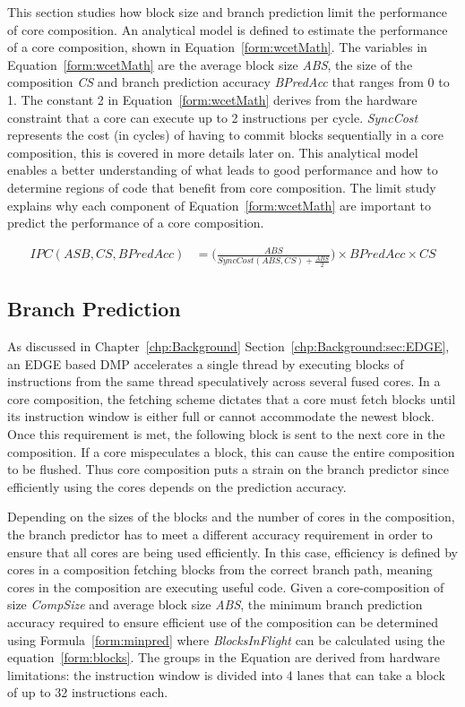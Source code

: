 This section studies how block size and branch prediction limit the performance of core composition.
An analytical model is defined to estimate the performance of a core composition, shown in Equation~\ref{form:wcetMath}.
The variables in Equation~\ref{form:wcetMath} are the average block size \textit{ABS},  the size of the composition \textit{CS} and branch prediction accuracy \textit{BPredAcc} that ranges from 0 to 1.
The constant 2 in Equation~\ref{form:wcetMath} derives from the hardware constraint that a core can execute up to 2 instructions per cycle.
\textit{SyncCost} represents the cost (in cycles) of having to commit blocks sequentially in a core composition, this is covered in more details later on.
This analytical model enables a better understanding of what leads to good performance and how to determine regions of code that benefit from core composition.
The limit study explains why each component of Equation~\ref{form:wcetMath} are important to predict the performance of a core composition.

\begin{align}\label{form:wcetMath}
IPC(ASB,CS,BPredAcc) &= \bigg(\frac{ABS}{SyncCost(ABS,CS) + {\frac{ABS}{2}}}\bigg) \times BPredAcc \times CS
\end{align}


\subsection{Branch Prediction}

As discussed in Chapter~\ref{chp:Background} Section~\ref{chp:Background:sec:EDGE}, an EDGE based DMP accelerates a single thread by executing blocks of instructions from the same thread speculatively across several fused cores. 
In a core composition, the fetching scheme dictates that a core must fetch blocks until its instruction window is either full or cannot accommodate the newest block.
Once this requirement is met, the following block is sent to the next core in the composition.
If a core mispeculates a block, this can cause the entire composition to be flushed.
Thus core composition puts a strain on the branch predictor since efficiently using the cores depends on the prediction accuracy.

Depending on the sizes of the blocks and the number of cores in the composition, the branch predictor has to meet a different accuracy requirement in order to ensure that all cores are being used efficiently.
In this case, efficiency is defined by cores in a composition fetching blocks from the correct branch path, meaning cores in the composition are executing useful code.
Given a core-composition of size \textit{CompSize} and average block size \textit{ABS}, the minimum branch prediction accuracy required to ensure efficient use of the composition can be determined using Formula~\ref{form:minpred} where \textit{BlocksInFlight} can be calculated using the equation~\ref{form:blocks}.
The groups in the Equation are derived from hardware limitations: the instruction window is divided into 4 lanes that can take a block of up to 32 instructions each.

